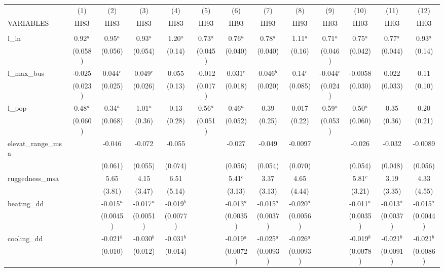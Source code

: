 \documentclass[]{article}
\begin{document}
\begin{tabular}{lcccccccccccc} \hline
 & (1) & (2) & (3) & (4) & (5) & (6) & (7) & (8) & (9) & (10) & (11) & (12) \\
VARIABLES & IH83 & IH83 & IH83 & IH83 & IH93 & IH93 & IH93 & IH93 & IH03 & IH03 & IH03 & IH03 \\ \hline
 &  &  &  &  &  &  &  &  &  &  &  &  \\
l\_ln & 0.92$^a$ & 0.95$^a$ & 0.93$^a$ & 1.20$^a$ & 0.73$^a$ & 0.76$^a$ & 0.78$^a$ & 1.11$^a$ & 0.71$^a$ & 0.75$^a$ & 0.77$^a$ & 0.93$^a$ \\
 & (0.058) & (0.056) & (0.054) & (0.14) & (0.045) & (0.040) & (0.040) & (0.16) & (0.046) & (0.042) & (0.044) & (0.14) \\
l\_max\_bus & -0.025 & 0.044$^c$ & 0.049$^c$ & 0.055 & -0.012 & 0.031$^c$ & 0.046$^b$ & 0.14$^c$ & -0.044$^c$ & -0.0058 & 0.022 & 0.11 \\
 & (0.023) & (0.025) & (0.026) & (0.13) & (0.017) & (0.018) & (0.020) & (0.085) & (0.024) & (0.030) & (0.033) & (0.10) \\
l\_pop & 0.48$^a$ & 0.34$^a$ & 1.01$^a$ & 0.13 & 0.56$^a$ & 0.46$^a$ & 0.39 & 0.017 & 0.59$^a$ & 0.50$^a$ & 0.35 & 0.20 \\
 & (0.060) & (0.068) & (0.36) & (0.28) & (0.051) & (0.052) & (0.25) & (0.22) & (0.053) & (0.060) & (0.36) & (0.21) \\
elevat\_range\_msa &  & -0.046 & -0.072 & -0.055 &  & -0.027 & -0.049 & -0.0097 &  & -0.026 & -0.032 & -0.0089 \\
 &  & (0.061) & (0.055) & (0.074) &  & (0.056) & (0.054) & (0.070) &  & (0.054) & (0.048) & (0.056) \\
ruggedness\_msa &  & 5.65 & 4.15 & 6.51 &  & 5.41$^c$ & 3.37 & 4.65 &  & 5.81$^c$ & 3.19 & 4.33 \\
 &  & (3.81) & (3.47) & (5.14) &  & (3.13) & (3.13) & (4.44) &  & (3.21) & (3.35) & (4.55) \\
heating\_dd &  & -0.015$^a$ & -0.017$^a$ & -0.019$^b$ &  & -0.013$^a$ & -0.015$^a$ & -0.020$^a$ &  & -0.011$^a$ & -0.013$^a$ & -0.015$^a$ \\
 &  & (0.0045) & (0.0051) & (0.0077) &  & (0.0035) & (0.0037) & (0.0056) &  & (0.0035) & (0.0037) & (0.0044) \\
cooling\_dd &  & -0.021$^b$ & -0.030$^b$ & -0.031$^b$ &  & -0.019$^a$ & -0.025$^a$ & -0.026$^a$ &  & -0.019$^b$ & -0.021$^b$ & -0.021$^b$ \\
 &  & (0.010) & (0.012) & (0.014) &  & (0.0072) & (0.0093) & (0.0093) &  & (0.0078) & (0.0091) & (0.0086) \\

\end{tabular}
\end{document}
